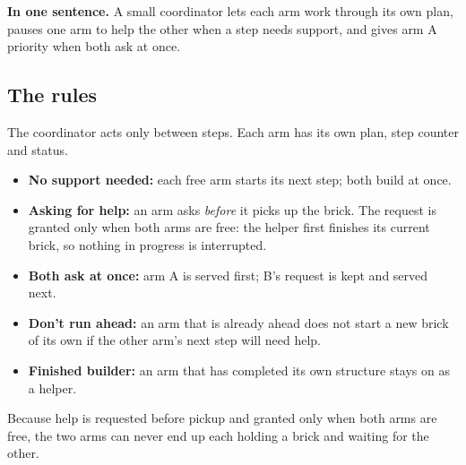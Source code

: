 \documentclass[11pt,a4paper]{article}
\newcommand{\keyidea}[1]{\par\smallskip\noindent\colorbox{keyc}{\parbox{\dimexpr\linewidth-2\fboxsep}{\small\textbf{In one sentence.} #1}}\par\smallskip}
\begin{document}
\keyidea{A small coordinator lets each arm work through its own plan, pauses one arm
to help the other when a step needs support, and gives arm A priority when both
ask at once.}

\subsection{The rules}
The coordinator acts only between steps. Each arm has its own plan, step counter
and status.
\begin{itemize}
\item \textbf{No support needed:} each free arm starts its next step; both build at once.
\item \textbf{Asking for help:} an arm asks \emph{before} it picks up the brick. The request
      is granted only when both arms are free: the helper first finishes its current
      brick, so nothing in progress is interrupted.
\item \textbf{Both ask at once:} arm A is served first; B's request is kept and served next.
\item \textbf{Don't run ahead:} an arm that is already ahead does not start a new brick of
      its own if the other arm's next step will need help.
\item \textbf{Finished builder:} an arm that has completed its own structure stays on as a
      helper.
\end{itemize}
Because help is requested before pickup and granted only when both arms are
free, the two arms can never end up each holding a brick and waiting for the
other.
\end{document}
